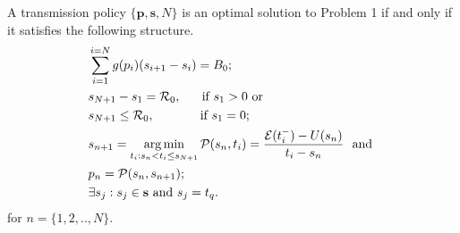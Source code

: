 \begin{algorithm}
\begin{algorithmic}[1]
\end{algorithmic}
\end{algorithm}


\begin{theorem}
A transmission policy $\{\textbf{p},\textbf{s},N\}$ is an optimal solution to Problem 1 if and only if it satisfies the following structure.
\label{th_algo1_1}
\begin{align}
&\sum_{i=1}^{i=N}g(p_i)(s_{i+1}-s_i)=B_0; 								
\label{claim1}
\\
&\nonumber s_{N+1}-s_1=\mathcal{R}_0, 	 \ \ \ \ 						\text{ if } s_1>0 \text{ or }
\\
& s_{N+1}\le \mathcal{R}_0,				\ \ \ \ \ \ \ \ \ \				\text{ if } s_1=0;
\label{claim2}
\\
& \nonumber s_{n+1}=\argmin_{t_i: s_n < t_i \le s_{N+1}} \mathcal{P}(s_n,t_i)=\dfrac{\ETx(t_i^-)-U(s_n)}{t_i-s_n} \	\text{ and }
\\
&p_n=\mathcal{P}(s_{n},s_{n+1});\label{claim3}							
\\
&\exists s_j:s_j\in \textbf{s} \text{ and } s_j=t_q.					
\label{claim4}
\end{align}
for $n=\{ 1,2,..,N\}$.
\end{theorem}
